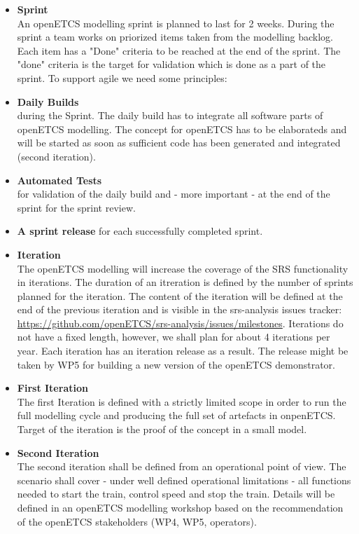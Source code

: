 \documentclass{template/openetcs_report}
\begin{document}
\begin{description}
\begin{itemize}
\item \textbf{Sprint}\\
An openETCS modelling sprint is planned to last for 2 weeks. During the sprint a team works on priorized items taken from the modelling backlog. Each item has a "Done" criteria to be reached at the end of the sprint. The "done" criteria is the target for validation which is done as a part of the sprint. To support agile we need some principles:
\item \textbf{Daily Builds}\\
 during the Sprint. The daily build has to integrate all software parts of openETCS modelling. The concept for openETCS has to be elaborateds and will be started as soon as sufficient code has been generated and integrated (second iteration).
\item \textbf{Automated Tests}\\
 for validation of the daily build and - more important - at the end of the sprint for the sprint review.
\item \textbf{A sprint release} for each successfully completed sprint.
\item \textbf{Iteration}\\
The openETCS modelling will increase the coverage of the SRS functionality in iterations. The duration of an itreration is defined by the number of sprints planned for the iteration. The content of the iteration will be defined at the end of the previous iteration and is visible in the srs-analysis issues tracker:
\url{https://github.com/openETCS/srs-analysis/issues/milestones}. Iterations do not have a fixed length, however, we shall plan for about 4 iterations per year. Each iteration has an iteration release as a result. The release might be taken by WP5 for building a new version of the openETCS demonstrator.
\item \textbf{First Iteration}\\
The first Iteration is defined with a strictly limited scope in order to run the full modelling cycle and producing the full set of artefacts in onpenETCS. Target of the iteration is the proof of the concept in a small model.
\item \textbf{Second Iteration}\\
The second iteration shall be defined from an operational point of view. The scenario shall cover - under well defined operational limitations - all functions needed to start the train, control speed and stop the train. Details will be defined in an openETCS modelling workshop based on the recommendation of the openETCS stakeholders (WP4, WP5, operators).


\end{itemize}
\end{description}
\end{document}
